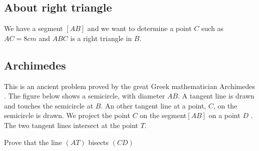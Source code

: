  \vfill\newpage

\subsection{About right triangle}

We have a segment $[AB]$ and we want to determine a point $C$ such as $AC=8 cm$ and $ABC$ is a right triangle in $B$.

\begin{center}
\begin{tkzexample}[]
\end{tkzexample}
\end{center}

 \vfill\newpage %

\subsection{Archimedes}

This is an ancient problem  proved by the great Greek mathematician Archimedes .
The figure below shows a semicircle, with diameter $AB$. A tangent line is drawn and  touches the semicircle at $B$.  An other tangent line at a point, $C$, on the semicircle is drawn. We project the point $C$ on the segment$[AB]$  on a point $D$ . The two tangent lines intersect at the point $T$.

Prove that the line $(AT)$ bisects $(CD)$

